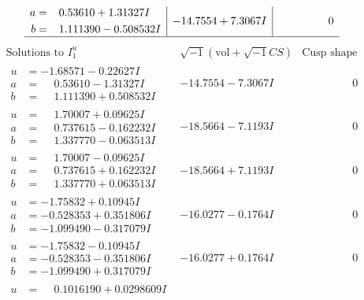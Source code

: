 \documentclass[1p]{elsarticle_modified}
\theoremstyle{definition}
\newcommand{\I}{\sqrt{-1}}
\begin{document}
$$\begin{array}{c|c|c}
\begin{aligned}
a &= \phantom{-}0.53610 + 1.31327 I \\
b &= \phantom{-}1.111390 - 0.508532 I\end{aligned}
 & -14.7554 + 7.3067 I & \phantom{-0.000000 } 0\\
 \hline 
 \end{array}$$\newpage$$\begin{array}{c|c|c}  
\text{Solutions to }I^u_{1}& \I (\text{vol} + \sqrt{-1}CS) & \text{Cusp shape}\\
 \hline 
\begin{aligned}
u &= -1.68571 - 0.22627 I \\
a &= \phantom{-}0.53610 - 1.31327 I \\
b &= \phantom{-}1.111390 + 0.508532 I\end{aligned}
 & -14.7554 - 7.3067 I & \phantom{-0.000000 } 0 \\ \hline\begin{aligned}
u &= \phantom{-}1.70007 + 0.09625 I \\
a &= \phantom{-}0.737615 - 0.162232 I \\
b &= \phantom{-}1.337770 - 0.063513 I\end{aligned}
 & -18.5664 - 7.1193 I & \phantom{-0.000000 } 0 \\ \hline\begin{aligned}
u &= \phantom{-}1.70007 - 0.09625 I \\
a &= \phantom{-}0.737615 + 0.162232 I \\
b &= \phantom{-}1.337770 + 0.063513 I\end{aligned}
 & -18.5664 + 7.1193 I & \phantom{-0.000000 } 0 \\ \hline\begin{aligned}
u &= -1.75832 + 0.10945 I \\
a &= -0.528353 + 0.351806 I \\
b &= -1.099490 - 0.317079 I\end{aligned}
 & -16.0277 - 0.1764 I & \phantom{-0.000000 } 0 \\ \hline\begin{aligned}
u &= -1.75832 - 0.10945 I \\
a &= -0.528353 - 0.351806 I \\
b &= -1.099490 + 0.317079 I\end{aligned}
 & -16.0277 + 0.1764 I & \phantom{-0.000000 } 0 \\ \hline\begin{aligned}
u &= \phantom{-}0.1016190 + 0.0298609 I \\

\end{aligned}
\end{array}$$
\end{document}
